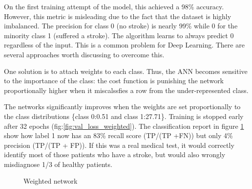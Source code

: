 \documentclass[proposal]{softeng}
\begin{document}
On the first training attempt of the model, this achieved a 98\% accuracy. However, this metric is misleading due to the fact that the dataset is highly imbalanced. The precision for class 0 (no stroke) is nearly 99\% while 0 for the minority class 1 (suffered a stroke). The algorithm learns to always predict 0 regardless of the input. This is a common problem for Deep Learning. There are several approaches worth discussing to overcome this.

One solution is to attach weights to each class\cite{cost_sensitive}\cite{WangS}. Thus, the ANN becomes sensitive to the importance of the class: the cost function is punishing the network proportionally higher when it miscalssfies a row from the under-represented class.

The networks significantly improves when the weights are set proportionally to the class distributions \{class 0:0.51 and class 1:27.71\}. Training is stopped early after 32 epochs (fig:\ref{fig:val_loss_weighted}).  The classification report in figure   \ref{fig:weighted_ann} show how label 1 now has an 83\% recall score (TP/(TP +FN)) but only 4\% precision (TP/(TP + FP)). If this was a real medical test, it would correctly identify most of those patients who have a stroke, but would also wrongly misdiagnose 1/3 of healthy patients.


\begin{figure}
    \centering
    \subfigure
    {
    \centering
        
        \label{fig:first_sub}
        \centering
    }
    \caption{Weighted network}
    \label{fig:weighted_ann}
\end{figure}
   
\end{document}
